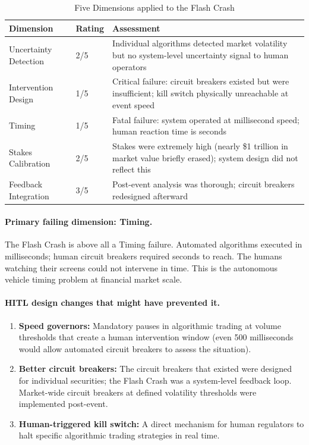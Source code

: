 \begin{table}[htbp]
\caption{Five Dimensions applied to the Flash Crash}
\label{tab:flash-crash-five-dim}
\centering
\begin{tabular}{@{}p{3cm}p{1.5cm}p{7cm}@{}}
\toprule
\textbf{Dimension} & \textbf{Rating} & \textbf{Assessment} \\
\midrule
Uncertainty Detection & 2/5 & Individual algorithms detected market volatility but no system-level uncertainty signal to human operators \\
Intervention Design & 1/5 & Critical failure: circuit breakers existed but were insufficient; kill switch physically unreachable at event speed \\
Timing & 1/5 & Fatal failure: system operated at millisecond speed; human reaction time is seconds \\
Stakes Calibration & 2/5 & Stakes were extremely high (nearly \$1 trillion in market value briefly erased); system design did not reflect this \\
Feedback Integration & 3/5 & Post-event analysis was thorough; circuit breakers redesigned afterward \\
\bottomrule
\end{tabular}
\end{table}

\paragraph{Primary failing dimension: Timing.}

The Flash Crash is above all a Timing failure. Automated algorithms executed in milliseconds; human circuit breakers required seconds to reach. The humans watching their screens could not intervene in time. This is the autonomous vehicle timing problem at financial market scale.

\paragraph{HITL design changes that might have prevented it.}

\begin{enumerate}
    \item \textbf{Speed governors:} Mandatory pauses in algorithmic trading at volume thresholds that create a human intervention window (even 500 milliseconds would allow automated circuit breakers to assess the situation).
    \item \textbf{Better circuit breakers:} The circuit breakers that existed were designed for individual securities; the Flash Crash was a system-level feedback loop. Market-wide circuit breakers at defined volatility thresholds were implemented post-event.
    \item \textbf{Human-triggered kill switch:} A direct mechanism for human regulators to halt specific algorithmic trading strategies in real time.
\end{enumerate}


